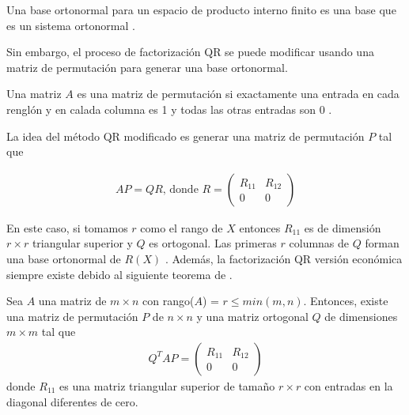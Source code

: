 \begin{definition}
Una base ortonormal para un espacio de producto interno finito es una base que es un sistema ortonormal \cite[p.~149]{garcia2017second}.
\end{definition}

Sin embargo, el proceso de factorización QR se puede modificar usando una matriz de permutación para generar una base ortonormal.


\begin{definition}
Una matriz $A$ es una matriz de permutación si exactamente una entrada en cada renglón y en calada columna es 1 y todas las otras entradas son 0 \cite[p.~183]{garcia2017second}.
\end{definition}

La idea del método QR modificado es generar una matriz de permutación $P$ tal que 

\begin{equation*}
    \begin{aligned}
    AP = QR \text{, donde }
    R = 
    \begin{pmatrix}
    	R_{11} & R_{12} \\
    	0      & 0
    \end{pmatrix}
    \end{aligned}
\end{equation*}

En este caso, si tomamos $r$ como el rango de $X$ entonces $R_{11}$ es de dimensión $r \times r$ triangular superior y $Q$ es ortogonal. Las primeras $r$ columnas de $Q$ forman una base ortonormal de $R(X)$ \cite{numerical_linear_algebra}. Además, la factorización QR versión económica siempre existe debido al siguiente teorema de \cite[p.~532]{numerical_linear_algebra} .

\begin{theorem} \label{exitencia_QR_dec}
Sea $A$ una matriz de $m \times n$ con rango($A$) = $r \leq min (m, n)$. Entonces, existe una matriz de permutación $P$ de $n \times n$ y una matriz ortogonal $Q$ de dimensiones $m \times m$ tal que 
\begin{equation*}
\begin{aligned}
Q^{T}AP = 
\begin{pmatrix}
R_{11} & R_{12} \\
   0      & 0
\end{pmatrix}
\end{aligned}
\end{equation*}
donde $R_{11}$ es una matriz triangular superior de tamaño $r \times r$ con entradas en la diagonal diferentes de cero.
\end{theorem}

